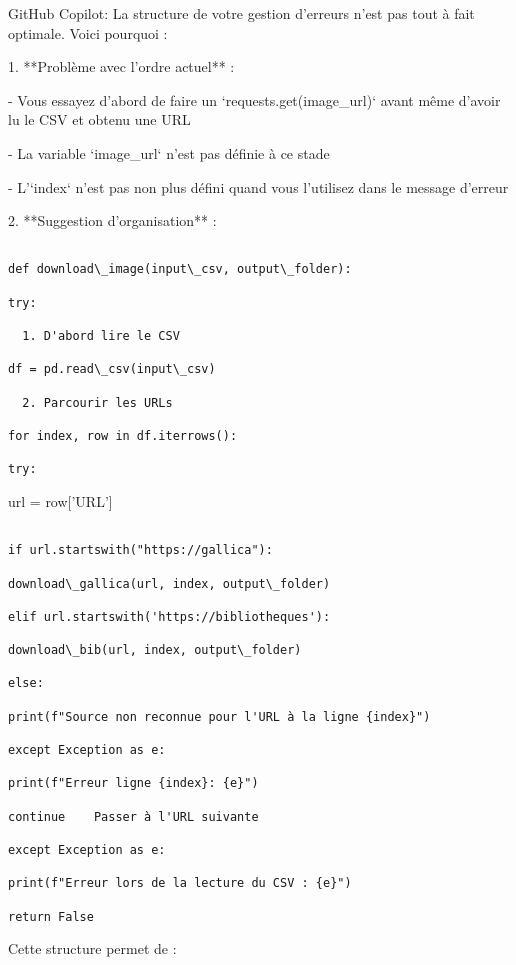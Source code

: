 GitHub Copilot: La structure de votre gestion d'erreurs n'est pas tout à fait optimale. Voici pourquoi :

1. **Problème avec l'ordre actuel** :

- Vous essayez d'abord de faire un `requests.get(image\_url)` avant même d'avoir lu le CSV et obtenu une URL

- La variable `image\_url` n'est pas définie à ce stade

- L'`index` n'est pas non plus défini quand vous l'utilisez dans le message d'erreur

2. **Suggestion d'organisation** :

\begin{verbatim}

def download\_image(input\_csv, output\_folder):

try:

  1. D'abord lire le CSV

df = pd.read\_csv(input\_csv)

  2. Parcourir les URLs

for index, row in df.iterrows():

try:

\end{verbatim}

url = row['URL']

\begin{verbatim}

if url.startswith("https://gallica"):

download\_gallica(url, index, output\_folder)

elif url.startswith('https://bibliotheques'):

download\_bib(url, index, output\_folder)

else:

print(f"Source non reconnue pour l'URL à la ligne {index}")

except Exception as e:

print(f"Erreur ligne {index}: {e}")

continue    Passer à l'URL suivante

except Exception as e:

print(f"Erreur lors de la lecture du CSV : {e}")

return False

\end{verbatim}

Cette structure permet de :

